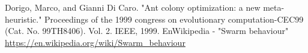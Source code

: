 \begin{thebibliography}{99}
     Dorigo, Marco, and Gianni Di Caro. "Ant colony optimization: a new meta-heuristic." Proceedings of the 1999 congress on evolutionary computation-CEC99 (Cat. No. 99TH8406). Vol. 2. IEEE, 1999.
     EnWikipedia - "Swarm behaviour" \url{https://en.wikipedia.org/wiki/Swarm_behaviour}
\end{thebibliography}